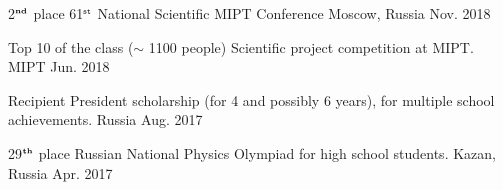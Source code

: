 \begin{cvhonors}
  \cvhonor
    {2$^{\textbf{\tiny nd}}$ place} %
    {61$^{\texttt{\tiny st}}$ National Scientific MIPT Conference} %
    {Moscow, Russia} %
    {Nov. 2018} %
    
  \cvhonor
    {Top 10 of the class ($\sim$ 1100 people)} %
    {Scientific project competition at MIPT.} %
    {MIPT} %
    {Jun. 2018} %
    
  \cvhonor
    {Recipient} %
    {President scholarship (for 4 and possibly 6 years), for multiple school achievements.} %
    {Russia} %
    {Aug. 2017} %

  \cvhonor
    {29$^{\textbf{\tiny th}}$ place} %
    {Russian National Physics Olympiad for high school students.} %
    {Kazan, Russia} %
    {Apr. 2017} %
	
\end{cvhonors}
